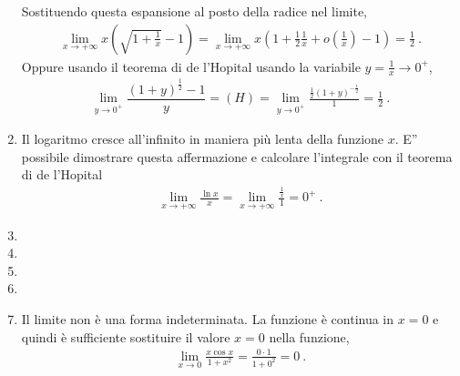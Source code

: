 \documentclass[letterpaper,10pt,italian]{jupyterBook}
\begin{document}
\begin{enumerate}
\sphinxAtStartPar
Sostituendo questa espansione al posto della radice nel limite,
\begin{equation*}
\begin{split}\lim_{x \to +\infty} x \left( \sqrt{1+ \frac{1}{x}} - 1 \right) = \lim_{x \to +\infty} x \left( 1 + \frac{1}{2}\frac{1}{x} + o\left(\frac{1}{x}\right) - 1 \right) = \frac{1}{2} \ .\end{split}
\end{equation*}
\sphinxAtStartPar
Oppure usando il teorema di de l’Hopital usando la variabile \(y = \frac{1}{x} \to 0^+\),
\begin{equation*}
\begin{split}\lim_{y \to 0^+} \dfrac{(1+y)^{\frac{1}{2}} - 1}{y} =(H)= \lim_{y \to 0^+} \frac{\frac{1}{2}(1+y)^{-\frac{1}{2}}}{1} = \frac{1}{2} \ .\end{split}
\end{equation*}
\item {} 
\sphinxAtStartPar
Il logaritmo cresce all’infinito in maniera più lenta della funzione \(x\). E” possibile dimostrare questa affermazione e calcolare l’integrale con il teorema di de l’Hopital
\begin{equation*}
\begin{split}\lim_{x \to +\infty} \frac{\ln x}{x} = \lim_{x \to +\infty} \frac{\frac{1}{x}}{1} = 0^+ \ .\end{split}
\end{equation*}
\item {} 
\item {} 
\item {} 
\item {} 
\item {} 
\sphinxAtStartPar
Il limite non è una forma indeterminata. La funzione è continua in \(x = 0\) e quindi è sufficiente sostituire il valore \(x=0\) nella funzione,
\begin{equation*}
\begin{split}\lim_{x \to 0} \frac{x \cos x}{1 + x^2} = \frac{0 \cdot 1}{1 + 0^2} = 0 \ .\end{split}
\end{equation*}
\end{enumerate}
\end{document}
